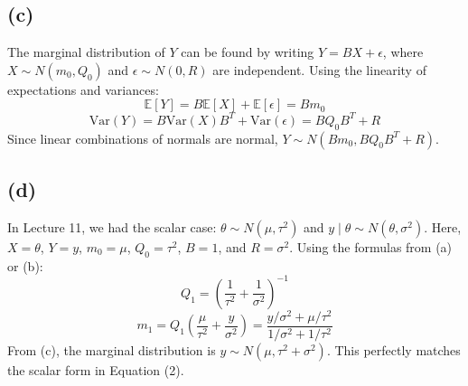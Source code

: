 \documentclass[
  letterpaper,
  DIV=11,
  numbers=noendperiod]{scrartcl}
\begin{document}
\subsection{(c)}\label{c-4}

The marginal distribution of \(Y\) can be found by writing
\(Y = BX + \epsilon\), where \(X \sim N(m_0, Q_0)\) and
\(\epsilon \sim N(0, R)\) are independent. Using the linearity of
expectations and variances: \[
\mathbb{E}[Y] = B \mathbb{E}[X] + \mathbb{E}[\epsilon] = B m_0
\] \[
\text{Var}(Y) = B \text{Var}(X) B^T + \text{Var}(\epsilon) = B Q_0 B^T + R
\] Since linear combinations of normals are normal,
\(Y \sim N(Bm_0, BQ_0B^T + R)\).

\subsection{(d)}\label{d-3}

In Lecture 11, we had the scalar case: \(\theta \sim N(\mu, \tau^2)\)
and \(y \mid \theta \sim N(\theta, \sigma^2)\). Here, \(X = \theta\),
\(Y = y\), \(m_0 = \mu\), \(Q_0 = \tau^2\), \(B = 1\), and
\(R = \sigma^2\). Using the formulas from (a) or (b): \[
Q_1 = \left( \frac{1}{\tau^2} + \frac{1}{\sigma^2} \right)^{-1}
\] \[
m_1 = Q_1 \left( \frac{\mu}{\tau^2} + \frac{y}{\sigma^2} \right) = \frac{y/\sigma^2 + \mu/\tau^2}{1/\sigma^2 + 1/\tau^2}
\] From (c), the marginal distribution is
\(y \sim N(\mu, \tau^2 + \sigma^2)\). This perfectly matches the scalar
form in Equation (2).
\end{document}
